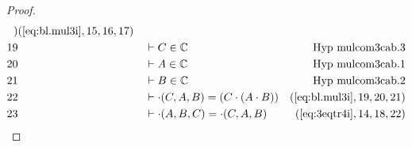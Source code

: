 \begin{proof}
\begin{align}
     )&(\mbox{\ref{eq:bl.mul3i}},15,16,17)\notag
  \\ 19 &&  & \vdash C \in
\mathbb{C}&\text{Hyp~mulcom3cab.3}\notag%
  \\ 20 &&  & \vdash A \in
\mathbb{C}&\text{Hyp~mulcom3cab.1}\notag%
  \\ 21 &&  & \vdash B \in
\mathbb{C}&\text{Hyp~mulcom3cab.2}\notag%
  \\ 22 &&  & \vdash \cdot( C , A , B ) = ( C \cdot ( A \cdot B )
     )&(\mbox{\ref{eq:bl.mul3i}},19,20,21)\notag
  \\ 23 &&  & \vdash \cdot( A , B , C ) = \cdot( C , A , B
     )&(\mbox{\ref{eq:3eqtr4i}},14,18,22)\notag
\end{align}
\end{proof}

